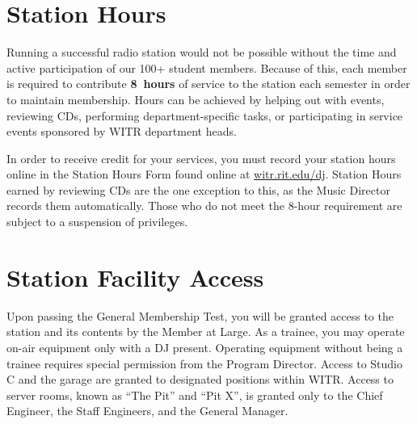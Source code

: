 \documentclass{witrman}
\begin{document}
\section{Station Hours}
Running a successful radio station would not be possible without the time and
active participation of our 100+ student members. Because of this, each member
is required to contribute \textbf{8~hours} of service to the station each
semester in order to maintain membership. Hours can be achieved by helping out
with events, reviewing CDs, performing department-specific tasks, or
participating in service events sponsored by WITR department heads.

In order to receive credit for your services, you must record your station hours
online in the Station Hours Form found online at
\href{http://witr.rit.edu/dj}{witr.rit.edu/dj}. Station Hours earned by
reviewing CDs are the one exception to this, as the Music Director records them
automatically. Those who do not meet the 8-hour requirement are subject to a
suspension of privileges.

\section{Station Facility Access}
Upon passing the General Membership Test, you will be granted access to the
station and its contents by the Member at Large. As a trainee, you may operate
on-air equipment only with a DJ present. Operating equipment without being a
trainee requires special permission from the Program Director. Access to Studio
C and the garage are granted to designated positions within WITR\@. Access to
server rooms, known as ``The Pit'' and ``Pit X'', is granted only to the Chief
Engineer, the Staff Engineers, and the General Manager.
\end{document}
